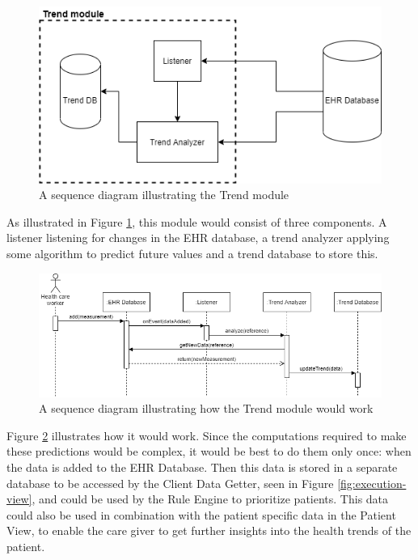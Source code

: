\documentclass{article}
\begin{document}
\begin{figure}[h]
    \centering
    \includegraphics[scale = 0.45]{trend-module}
    \caption{A sequence diagram illustrating the Trend module}
    \label{fig:trend-module}
\end{figure}

As illustrated in Figure \ref{fig:trend-module}, this module would consist of three components. A listener listening for changes in the EHR database, a trend analyzer applying some algorithm to predict future values and a trend database to store this.

\begin{figure}[h]
    \centering
    \includegraphics[scale = 0.45]{trend-sequence}
    \caption{A sequence diagram illustrating how the Trend module would work}
    \label{fig:trend-sequence}
\end{figure}

Figure \ref{fig:trend-sequence} illustrates how it would work. Since the computations required to make these predictions would be complex, it would be best to do them only once: when the data is added to the EHR Database. Then this data is stored in a separate database to be accessed by the Client Data Getter, seen in Figure \ref{fig:execution-view}, and could be used by the Rule Engine to prioritize patients. This data could also be used in combination with the patient specific data in the Patient View, to enable the care giver to get further insights into the health trends of the patient.
\end{document}
